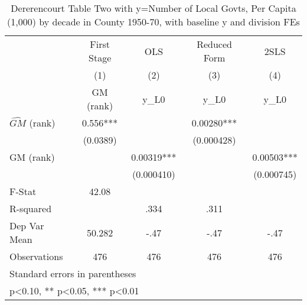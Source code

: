 \begin{table}[htbp]\centering
\def\sym#1{\ifmmode^{#1}\else\(^{#1}\)\fi}
\caption{Dererencourt Table Two with y=Number of Local Govts, Per Capita (1,000) by decade in County 1950-70, with baseline y and division FEs}
\begin{tabular}{l*{4}{c}}
\toprule
                    & First Stage   &         OLS   &Reduced Form   &        2SLS   \\
                    &\multicolumn{1}{c}{(1)}&\multicolumn{1}{c}{(2)}&\multicolumn{1}{c}{(3)}&\multicolumn{1}{c}{(4)}\\
                    &\multicolumn{1}{c}{GM  (rank)}&\multicolumn{1}{c}{y\_L0}&\multicolumn{1}{c}{y\_L0}&\multicolumn{1}{c}{y\_L0}\\
\midrule
$\hat{GM}$ (rank)   &       0.556***&               &     0.00280***&               \\
                    &    (0.0389)   &               &  (0.000428)   &               \\
\addlinespace
GM  (rank)          &               &     0.00319***&               &     0.00503***\\
                    &               &  (0.000410)   &               &  (0.000745)   \\
\midrule
F-Stat              &       42.08   &               &               &               \\
R-squared           &               &        .334   &        .311   &               \\
Dep Var Mean        &      50.282   &        -.47   &        -.47   &        -.47   \\
Observations        &         476   &         476   &         476   &         476   \\
\bottomrule
\multicolumn{5}{l}{\footnotesize Standard errors in parentheses}\\
\multicolumn{5}{l}{\footnotesize * p<0.10, ** p<0.05, *** p<0.01}\\
\end{tabular}
\end{table}
